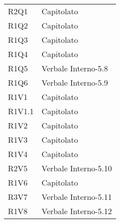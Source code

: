 \begin{center}
\begin{longtable}{C{6cm} C{6cm}}
R2Q1 & Capitolato \\
R1Q2 & Capitolato \\
R1Q3 & Capitolato \\
R1Q4 & Capitolato \\
R1Q5 & Verbale Interno-5.8 \\
R1Q6 & Verbale Interno-5.9 \\


R1V1 & Capitolato \\
R1V1.1 & Capitolato \\
R1V2 & Capitolato \\
R1V3 & Capitolato \\
R1V4 & Capitolato \\
R2V5 & Verbale Interno-5.10 \\
R1V6 & Capitolato \\
R3V7 & Verbale Interno-5.11 \\
R1V8 & Verbale Interno-5.12 \\

\end{longtable}
\end{center}